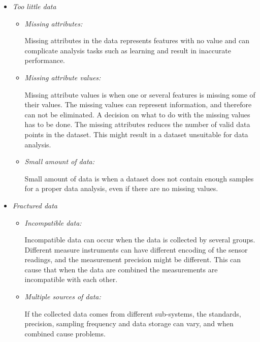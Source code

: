 \documentclass[english, a4paper]{report}
\begin{document}
{{{\begin{itemize}
                \item \textit{Too little data}
                
                \begin{itemize}
                    \item \textit{Missing attributes:}
                    \par
                    Missing attributes in the data represents features with no value and can complicate analysis tasks such as learning and result in inaccurate performance. 
                    
                    \item \textit{Missing attribute values:}
                    \par
                    Missing attribute values is when one or several features is missing some of their values. The missing values can represent information, and therefore can not be eliminated. A decision on what to do with the missing values has to be done. The missing attributes reduces the number of valid data points in the dataset. This might result in a dataset unsuitable for data analysis.
                    
                    \item \textit{Small amount of data:}
                    \par 
                    Small amount of data is when a dataset does not contain enough samples for a proper data analysis, even if there are no missing values.
                    
                \end{itemize}
                
                \item \textit{Fractured data}
                
                \begin{itemize}
                    \item \textit{Incompatible data:}
                    \par 
                    Incompatible data can occur when the data is collected by several groups. Different measure instruments can have different encoding of the sensor readings, and the measurement precision might be different. This can cause that when the data are combined the measurements are incompatible with each other.
                    
                    \item \textit{Multiple sources of data:}
                    \par 
                    If the collected data comes from different sub-systems, the standards, precision, sampling frequency and data storage can vary, and when combined cause problems.
                \end{itemize}
            \end{itemize} 
            
}}}
\end{document}
